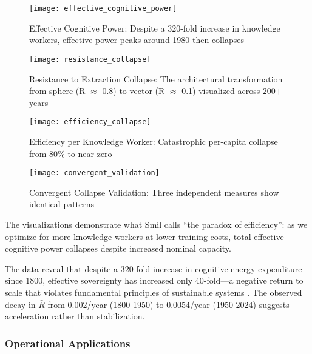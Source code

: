 \begin{figure}[h]
\centering
\texttt{[image: effective\_cognitive\_power]}
\caption{Effective Cognitive Power: Despite a 320-fold increase in knowledge workers, effective power peaks around 1980 then collapses}
\label{fig:effective_cognitive_power}
\end{figure}

\begin{figure}[h]
\centering
\texttt{[image: resistance\_collapse]}
\caption{Resistance to Extraction Collapse: The architectural transformation from sphere (R $\approx$ 0.8) to vector (R $\approx$ 0.1) visualized across 200+ years}
\label{fig:resistance_collapse}
\end{figure}

\begin{figure}[h]
\centering
\texttt{[image: efficiency\_collapse]}
\caption{Efficiency per Knowledge Worker: Catastrophic per-capita collapse from 80\% to near-zero}
\label{fig:efficiency_collapse}
\end{figure}

\begin{figure}[h]
\centering
\texttt{[image: convergent\_validation]}
\caption{Convergent Collapse Validation: Three independent measures show identical patterns}
\label{fig:convergent_validation}
\end{figure}

The visualizations demonstrate what Smil calls ``the paradox of efficiency'': as we optimize for more knowledge workers at lower training costs, total effective cognitive power collapses despite increased nominal capacity.

The data reveal that despite a 320-fold increase in cognitive energy expenditure since 1800, effective sovereignty has increased only 40-fold---a negative return to scale that violates fundamental principles of sustainable systems \citep{smil2019}. The observed decay in $\bar{R}$ from 0.002/year (1800-1950) to 0.0054/year (1950-2024) suggests acceleration rather than stabilization.

\subsubsection{Operational Applications}

